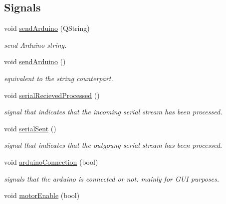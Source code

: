 \subsection*{Signals}
\begin{DoxyCompactItemize}
\item 
void \hyperlink{class_main_window_ab981601bdb64879cd197fb6a6f950e0d}{send\+Arduino} (Q\+String)
\begin{DoxyCompactList}\small\item\em send Arduino string. \end{DoxyCompactList}\item 
void \hyperlink{class_main_window_a5235e26460c2ceee33c224a9d73e6b07}{send\+Arduino} ()
\begin{DoxyCompactList}\small\item\em equivalent to the string counterpart. \end{DoxyCompactList}\item 
\hypertarget{class_main_window_ad00460208b40c79747484b516d1781ce}{void \hyperlink{class_main_window_ad00460208b40c79747484b516d1781ce}{serial\+Recieved\+Processed} ()}\label{class_main_window_ad00460208b40c79747484b516d1781ce}

\begin{DoxyCompactList}\small\item\em signal that indicates that the incoming serial stream has been processed. \end{DoxyCompactList}\item 
\hypertarget{class_main_window_aa3339440163a91fb4a142c18e3c0bd28}{void \hyperlink{class_main_window_aa3339440163a91fb4a142c18e3c0bd28}{serial\+Sent} ()}\label{class_main_window_aa3339440163a91fb4a142c18e3c0bd28}

\begin{DoxyCompactList}\small\item\em signal that indicates that the outgoung serial stream has been processed. \end{DoxyCompactList}\item 
\hypertarget{class_main_window_aac28c5eee22c78e3d3100aa3a0b3926f}{void \hyperlink{class_main_window_aac28c5eee22c78e3d3100aa3a0b3926f}{arduino\+Connection} (bool)}\label{class_main_window_aac28c5eee22c78e3d3100aa3a0b3926f}

\begin{DoxyCompactList}\small\item\em signals that the arduino is connected or not. mainly for G\+U\+I purposes. \end{DoxyCompactList}\item 
\hypertarget{class_main_window_acfedf6f2c7df900495eac711ec3d1f38}{void \hyperlink{class_main_window_acfedf6f2c7df900495eac711ec3d1f38}{motor\+Enable} (bool)}\label{class_main_window_acfedf6f2c7df900495eac711ec3d1f38}


\end{DoxyCompactItemize}
